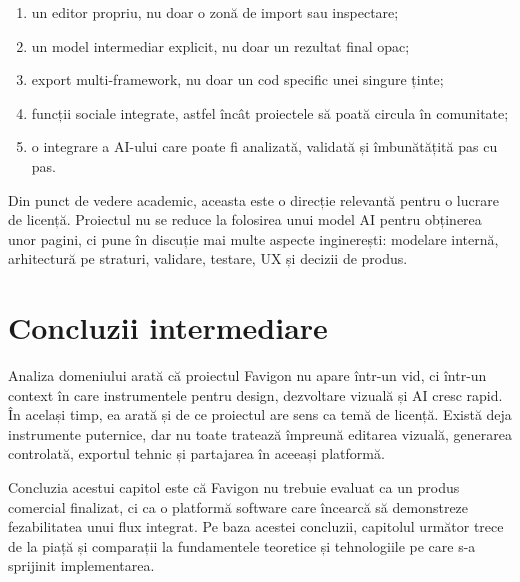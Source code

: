 \begin{enumerate}[leftmargin=1.5cm]
  \item un editor propriu, nu doar o zonă de import sau inspectare;
  \item un model intermediar explicit, nu doar un rezultat final opac;
  \item export multi-framework, nu doar un cod specific unei singure ținte;
  \item funcții sociale integrate, astfel încât proiectele să poată circula în comunitate;
  \item o integrare a AI-ului care poate fi analizată, validată și îmbunătățită pas cu pas.
\end{enumerate}

Din punct de vedere academic, aceasta este o direcție relevantă pentru o lucrare de licență. Proiectul nu se reduce la folosirea unui model AI pentru obținerea unor pagini, ci pune în discuție mai multe aspecte inginerești: modelare internă, arhitectură pe straturi, validare, testare, UX și decizii de produs.

\section{Concluzii intermediare}

Analiza domeniului arată că proiectul Favigon nu apare într-un vid, ci într-un context în care instrumentele pentru design, dezvoltare vizuală și AI cresc rapid. În același timp, ea arată și de ce proiectul are sens ca temă de licență. Există deja instrumente puternice, dar nu toate tratează împreună editarea vizuală, generarea controlată, exportul tehnic și partajarea în aceeași platformă.

Concluzia acestui capitol este că Favigon nu trebuie evaluat ca un produs comercial finalizat, ci ca o platformă software care încearcă să demonstreze fezabilitatea unui flux integrat. Pe baza acestei concluzii, capitolul următor trece de la piață și comparații la fundamentele teoretice și tehnologiile pe care s-a sprijinit implementarea.
